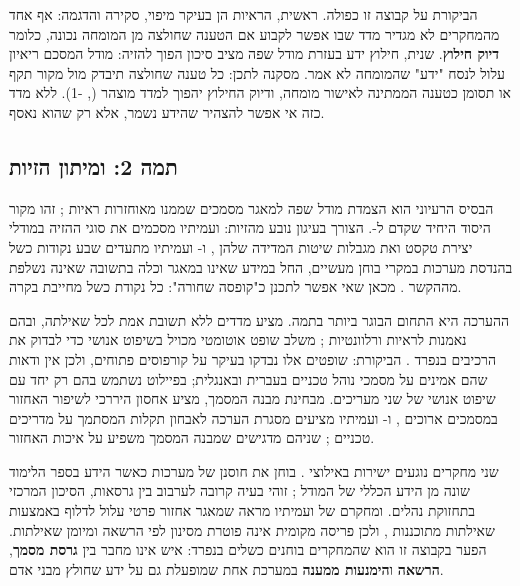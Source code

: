 הביקורת על קבוצה זו כפולה. ראשית, הראיות הן בעיקר מיפוי, סקירה והדגמה: אף אחד מהמחקרים לא מגדיר מדד שבו אפשר לקבוע אם
הטענה שחולצה מן המומחה נכונה, כלומר \textbf{דיוק חילוץ}. שנית, חילוץ ידע בעזרת מודל שפה מציב סיכון הפוך להזיה: מודל המסכם
ריאיון עלול לנסח "ידע" שהמומחה לא אמר. מסקנה לתכן: כל טענה שחולצה תיבדק מול מקור תקף או תסומן כטענה הממתינה לאישור מומחה,
ודיוק החילוץ יהפוך למדד מוצהר (, \hyp{1}). ללא מדד כזה אי אפשר להצהיר שהידע נשמר, אלא רק שהוא נאסף.

\subsection{תמה 2:  ומיתון הזיות}
הבסיס הרעיוני הוא הצמדת מודל שפה למאגר מסמכים שממנו מאוחזרות ראיות \cite{lewis2020retrieval}; זהו מקור היסוד היחיד שקדם
ל-. הצורך בעיגון נובע מהזיות:  ועמיתיו מסכמים את סוגי ההזיה במודלי יצירת טקסט ואת מגבלות שיטות המדידה
שלהן \cite{ji2023survey}, ו- ועמיתיו מתעדים שבע נקודות כשל בהנדסת מערכות  במקרי בוחן מעשיים,
החל במידע שאינו במאגר וכלה בתשובה שאינה נשלפת מההקשר \cite{barnett2024seven}. מכאן שאי אפשר לתכנן  כ"קופסה שחורה":
כל נקודת כשל מחייבת בקרה.

ההערכה היא התחום הבוגר ביותר בתמה.  מציע מדדים ללא תשובת אמת לכל שאילתה, ובהם נאמנות לראיות ורלוונטיות
\cite{es2024ragas};  משלב שופט אוטומטי מכויל בשיפוט אנושי כדי לבדוק את הרכיבים בנפרד \cite{saad2024ares}.
הביקורת: שופטים אלו נבדקו בעיקר על קורפוסים פתוחים, ולכן אין ודאות שהם אמינים על מסמכי נוהל טכניים בעברית ובאנגלית; בפיילוט
נשתמש בהם רק יחד עם שיפוט אנושי של שני מעריכים. מבחינת מבנה המסמך,  מציע אחסון היררכי לשיפור האחזור במסמכים ארוכים \cite{tao2025treerag}, ו- ועמיתיו מציעים מסגרת
הערכה לאבחון תקלות המסתמך על מדריכים טכניים \cite{lukens2025manuals}; שניהם מדגישים שמבנה המסמך משפיע על איכות האחזור.

שני מחקרים נוגעים ישירות באילוצי .  בוחן את חוסנן של מערכות  כאשר הידע בספר הלימוד שונה מן הידע הכללי של המודל
\cite{zheng2025knowshift}; זוהי בעיה קרובה לערבוב בין גרסאות, הסיכון המרכזי בתחזוקת נהלים. ומחקרם של
 ועמיתיו מראה שמאגר אחזור פרטי עלול לדלוף באמצעות שאילתות מתוכננות \cite{zeng2024good}, ולכן פריסה מקומית
אינה פוטרת מסינון לפי הרשאה ומיומן שאילתות. הפער בקבוצה זו הוא שהמחקרים בוחנים כשלים בנפרד: איש אינו מחבר בין
\textbf{גרסת מסמך}, \textbf{הרשאה} ו\textbf{הימנעות ממענה} במערכת אחת שמופעלת גם על ידע שחולץ מבני אדם.

